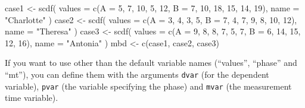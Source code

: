 \documentclass[
  letterpaper,
  DIV=11,
  numbers=noendperiod]{scrreprt}
\newenvironment{Shaded}{\begin{snugshade}}{\end{snugshade}}
\newcommand{\AttributeTok}[1]{\textcolor[rgb]{0.40,0.45,0.13}{#1}}
\newcommand{\DecValTok}[1]{\textcolor[rgb]{0.68,0.00,0.00}{#1}}
\newcommand{\FunctionTok}[1]{\textcolor[rgb]{0.28,0.35,0.67}{#1}}
\newcommand{\NormalTok}[1]{\textcolor[rgb]{0.00,0.23,0.31}{#1}}
\newcommand{\OtherTok}[1]{\textcolor[rgb]{0.00,0.23,0.31}{#1}}
\newcommand{\StringTok}[1]{\textcolor[rgb]{0.13,0.47,0.30}{#1}}
\begin{document}
\begin{Shaded}
\begin{Highlighting}[]
\NormalTok{case1 }\OtherTok{\textless{}{-}} \FunctionTok{scdf}\NormalTok{(}
  \AttributeTok{values =} \FunctionTok{c}\NormalTok{(}\AttributeTok{A =} \DecValTok{5}\NormalTok{, }\DecValTok{7}\NormalTok{, }\DecValTok{10}\NormalTok{, }\DecValTok{5}\NormalTok{, }\DecValTok{12}\NormalTok{, }\AttributeTok{B =} \DecValTok{7}\NormalTok{, }\DecValTok{10}\NormalTok{, }\DecValTok{18}\NormalTok{, }\DecValTok{15}\NormalTok{, }\DecValTok{14}\NormalTok{, }\DecValTok{19}\NormalTok{), }
  \AttributeTok{name =} \StringTok{"Charlotte"}
\NormalTok{)}
\NormalTok{case2 }\OtherTok{\textless{}{-}} \FunctionTok{scdf}\NormalTok{(}
  \AttributeTok{values =} \FunctionTok{c}\NormalTok{(}\AttributeTok{A =} \DecValTok{3}\NormalTok{, }\DecValTok{4}\NormalTok{, }\DecValTok{3}\NormalTok{, }\DecValTok{5}\NormalTok{, }\AttributeTok{B =} \DecValTok{7}\NormalTok{, }\DecValTok{4}\NormalTok{, }\DecValTok{7}\NormalTok{, }\DecValTok{9}\NormalTok{, }\DecValTok{8}\NormalTok{, }\DecValTok{10}\NormalTok{, }\DecValTok{12}\NormalTok{), }
  \AttributeTok{name =} \StringTok{"Theresa"}
\NormalTok{)}
\NormalTok{case3 }\OtherTok{\textless{}{-}} \FunctionTok{scdf}\NormalTok{(}
  \AttributeTok{values =} \FunctionTok{c}\NormalTok{(}\AttributeTok{A =} \DecValTok{9}\NormalTok{, }\DecValTok{8}\NormalTok{, }\DecValTok{8}\NormalTok{, }\DecValTok{7}\NormalTok{, }\DecValTok{5}\NormalTok{, }\DecValTok{7}\NormalTok{, }\AttributeTok{B =} \DecValTok{6}\NormalTok{, }\DecValTok{14}\NormalTok{, }\DecValTok{15}\NormalTok{, }\DecValTok{12}\NormalTok{, }\DecValTok{16}\NormalTok{), }
  \AttributeTok{name =} \StringTok{"Antonia"}
\NormalTok{)}
\NormalTok{mbd }\OtherTok{\textless{}{-}} \FunctionTok{c}\NormalTok{(case1, case2, case3)}
\end{Highlighting}
\end{Shaded}

If you want to use other than the default variable names (``values'',
``phase'' and ``mt''), you can define them with the arguments
\texttt{dvar} (for the dependent variable), \texttt{pvar} (the variable
specifying the phase) and \texttt{mvar} (the measurement time variable).
\end{document}
